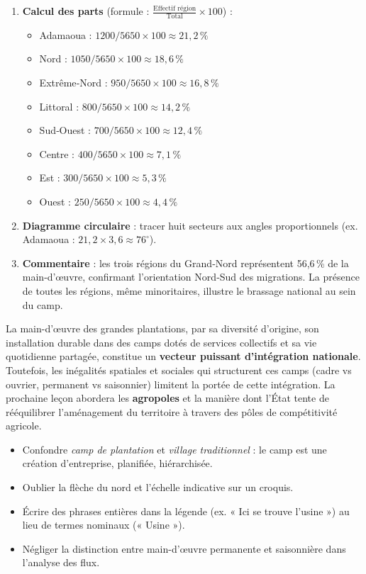 \documentclass[11pt]{article}
\newcounter{popsec}
\newcounter{popsub}
\newcommand{\courssub}[1]{%
  \stepcounter{popsub}%
  \par\vspace{9pt}\noindent{\popxbold\fontsize{11.5}{13}\selectfont\color{popink}{\color{poporange}\thepopsec.\thepopsub}\hspace{6pt}#1}\par\nopagebreak\vspace{4pt}
}
\begin{document}
\begin{corrige}[Exercice n°1]
\begin{enumerate}
\item \textbf{Calcul des parts} (formule : $\frac{\text{Effectif région}}{\text{Total}} \times 100$) :
\begin{itemize}
\item Adamaoua : $1200 / 5650 \times 100 \approx 21,2\,\%$
\item Nord : $1050 / 5650 \times 100 \approx 18,6\,\%$
\item Extrême‑Nord : $950 / 5650 \times 100 \approx 16,8\,\%$
\item Littoral : $800 / 5650 \times 100 \approx 14,2\,\%$
\item Sud‑Ouest : $700 / 5650 \times 100 \approx 12,4\,\%$
\item Centre : $400 / 5650 \times 100 \approx 7,1\,\%$
\item Est : $300 / 5650 \times 100 \approx 5,3\,\%$
\item Ouest : $250 / 5650 \times 100 \approx 4,4\,\%$
\end{itemize}
\item \textbf{Diagramme circulaire} : tracer huit secteurs aux angles proportionnels (ex. Adamaoua : $21,2 \times 3,6 \approx 76^\circ$).
\item \textbf{Commentaire} : les trois régions du Grand‑Nord représentent 56,6\,\% de la main-d'œuvre, confirmant l'orientation Nord‑Sud des migrations. La présence de toutes les régions, même minoritaires, illustre le brassage national au sein du camp.
\end{enumerate}
\end{corrige}

\courssub{Synthèse et ouverture}
La main-d'œuvre des grandes plantations, par sa diversité d'origine, son installation durable dans des camps dotés de services collectifs et sa vie quotidienne partagée, constitue un \textbf{vecteur puissant d'intégration nationale}. Toutefois, les inégalités spatiales et sociales qui structurent ces camps (cadre vs ouvrier, permanent vs saisonnier) limitent la portée de cette intégration. La prochaine leçon abordera les \textbf{agropoles} et la manière dont l'État tente de rééquilibrer l'aménagement du territoire à travers des pôles de compétitivité agricole.

\begin{attention}
\begin{itemize}
\item Confondre \emph{camp de plantation} et \emph{village traditionnel} : le camp est une création d'entreprise, planifiée, hiérarchisée.
\item Oublier la flèche du nord et l'échelle indicative sur un croquis.
\item Écrire des phrases entières dans la légende (ex. « Ici se trouve l'usine ») au lieu de termes nominaux (« Usine »).
\item Négliger la distinction entre main-d'œuvre permanente et saisonnière dans l'analyse des flux.
\end{itemize}
\end{attention}
\end{document}
